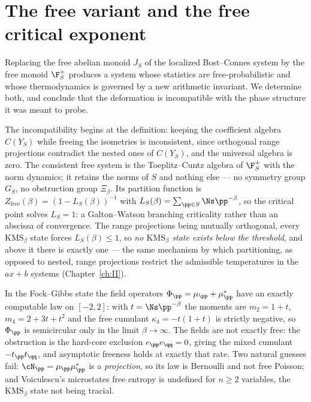 \chapter[The free variant]{The free variant and the free critical exponent}\label{ch:V}
\begin{summary}
Replacing the free abelian monoid $J_S$ of the localized Bost--Connes system by the free
monoid $\F_S^+$ produces a system whose statistics are free-probabilistic and whose
thermodynamics is governed by a new arithmetic invariant. We determine both, and conclude
that the deformation is incompatible with the phase structure it was meant to probe.

The incompatibility begins at the definition: keeping the coefficient algebra $C(Y_S)$ while
freeing the isometries is inconsistent, since orthogonal range projections contradict the
nested ones of $C(Y_S)$, and the universal algebra is zero. The consistent free system is
the Toeplitz--Cuntz algebra of $\F_S^+$ with the norm dynamics; it retains the norms of
$S$ and nothing else --- no symmetry group $G_S$, no obstruction group $\Xi_\beta$. Its
partition function is $Z_{\mathrm{free}}(\beta)=(1-L_S(\beta))^{-1}$ with
$L_S(\beta)=\sum_{\pp\in S}\Ns\pp^{-\beta}$, so the critical point solves $L_S=1$: a
Galton--Watson branching criticality rather than an abscissa of convergence. The range
projections being mutually orthogonal, every $\mathrm{KMS}_\beta$ state forces
$L_S(\beta)\le1$, so \emph{no $\mathrm{KMS}_\beta$ state exists below the threshold}, and
above it there is exactly one --- the same mechanism by which partitioning, as opposed to
nested, range projections restrict the admissible temperatures in the $ax+b$ systems
(Chapter~\ref{ch:II}).

In the Fock--Gibbs state the field operators $\Phi_\pp=\mu_\pp+\mu_\pp^*$ have an exactly
computable law on $[-2,2]$: with $t=\Ns\pp^{-\beta}$ the moments are $m_2=1+t$,
$m_4=2+3t+t^2$ and the free cumulant $\kappa_4=-t(1+t)$ is strictly negative, so
$\Phi_\pp$ is semicircular only in the limit $\beta\to\infty$. The fields are not exactly
free: the obstruction is the hard-core exclusion $e_\pp e_\qq=0$, giving the mixed cumulant
$-t_\pp t_\qq$, and asymptotic freeness holds at exactly that rate. Two natural guesses fail:
$\cN_\pp=\mu_\pp\mu_\pp^*$ is a \emph{projection}, so its law is Bernoulli and not free
Poisson; and Voiculescu's microstates free entropy is undefined for $n\ge2$ variables, the
$\mathrm{KMS}_\beta$ state not being tracial.


\end{summary}

